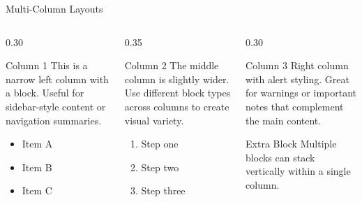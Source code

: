 \begin{frame}{Multi-Column Layouts}
  \begin{columns}[T]
    \begin{column}{0.30\textwidth}
      \begin{block}{\scriptsize Column 1}
        \tiny
        This is a narrow left column with a block. Useful for sidebar-style
        content or navigation summaries.
        \begin{itemize}
          \setlength{\itemsep}{0pt}
          \item Item A
          \item Item B
          \item Item C
        \end{itemize}
      \end{block}
    \end{column}
    \begin{column}{0.35\textwidth}
      \begin{exampleblock}{\scriptsize Column 2}
        \tiny
        The middle column is slightly wider. Use different block types
        across columns to create visual variety.
        \begin{enumerate}
          \setlength{\itemsep}{0pt}
          \item Step one
          \item Step two
          \item Step three
        \end{enumerate}
      \end{exampleblock}
    \end{column}
    \begin{column}{0.30\textwidth}
      \begin{alertblock}{\scriptsize Column 3}
        \tiny
        Right column with alert styling. Great for warnings or
        important notes that complement the main content.
      \end{alertblock}

      \vspace{0.1cm}

      \begin{block}{\scriptsize Extra Block}
        \tiny
        Multiple blocks can stack vertically within a single column.
      \end{block}
    \end{column}
  \end{columns}
\end{frame}
